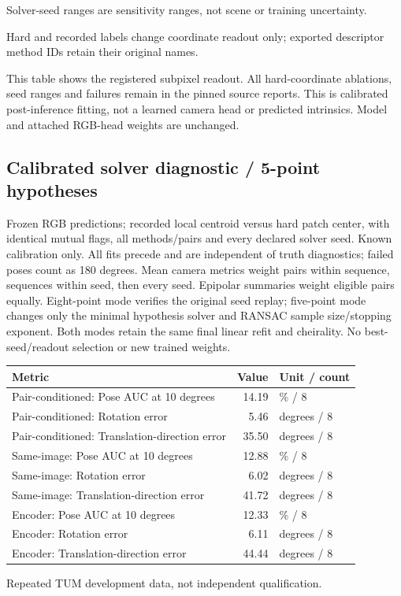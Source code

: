 \documentclass[10pt]{article}
\begin{document}
Solver-seed ranges are sensitivity ranges, not scene or training uncertainty.

Hard and recorded labels change coordinate readout only; exported descriptor method IDs retain their original names.

This table shows the registered subpixel readout. All hard-coordinate ablations, seed ranges and failures remain in the pinned source reports. This is calibrated post-inference fitting, not a learned camera head or predicted intrinsics. Model and attached RGB-head weights are unchanged.

\subsection{Calibrated solver diagnostic / 5-point hypotheses}
Frozen RGB predictions; recorded local centroid versus hard patch center, with identical mutual flags, all methods/pairs and every declared solver seed. Known calibration only. All fits precede and are independent of truth diagnostics; failed poses count as 180 degrees. Mean camera metrics weight pairs within sequence, sequences within seed, then every seed. Epipolar summaries weight eligible pairs equally. Eight-point mode verifies the original seed replay; five-point mode changes only the minimal hypothesis solver and RANSAC sample size/stopping exponent. Both modes retain the same final linear refit and cheirality. No best-seed/readout selection or new trained weights.
\begin{center}\begin{tabular}{p{.57\linewidth}rp{.23\linewidth}}\toprule Metric & Value & Unit / count \\ \midrule
Pair-conditioned: Pose AUC at 10 degrees & 14.19 & \% / 8 \\
Pair-conditioned: Rotation error & 5.46 & degrees / 8 \\
Pair-conditioned: Translation-direction error & 35.50 & degrees / 8 \\
Same-image: Pose AUC at 10 degrees & 12.88 & \% / 8 \\
Same-image: Rotation error & 6.02 & degrees / 8 \\
Same-image: Translation-direction error & 41.72 & degrees / 8 \\
Encoder: Pose AUC at 10 degrees & 12.33 & \% / 8 \\
Encoder: Rotation error & 6.11 & degrees / 8 \\
Encoder: Translation-direction error & 44.44 & degrees / 8 \\
\bottomrule\end{tabular}\end{center}
Repeated TUM development data, not independent qualification.
\end{document}
